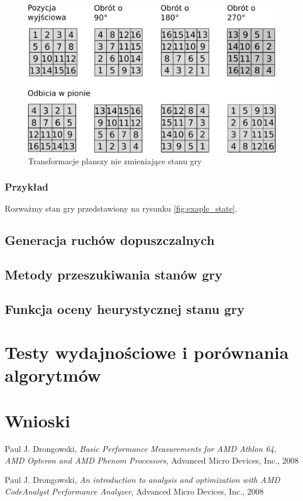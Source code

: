 \documentclass{scrartcl}
\begin{document}
\begin{figure}
  \centering
  \includegraphics[width=\textwidth]{data/field_order2.pdf}
  \caption{Transformacje planszy nie zmieniające stanu gry}
  \label{fig:field_order2}
\end{figure}


\subsubsection{Przykład}

Rozważmy stan gry przedstawiony na rysunku \ref{fig:exaple_state}.



\subsection{Generacja ruchów dopuszczalnych}

\subsection{Metody przeszukiwania stanów gry}

\subsection{Funkcja oceny heurystycznej stanu gry}

\section{Testy wydajnościowe i porównania algorytmów}

\section{Wnioski}

\begin{thebibliography}{9}

 Paul J. Drongowski,
  \emph{Basic Performance Measurements for AMD Athlon 64, 
AMD Opteron and AMD Phenom Processors}, Advanced Micro Devices, Inc.,
  2008

 Paul J. Drongowski,
  \emph{An introduction to analysis and optimization 
with AMD CodeAnalyst Performance Analyzer}, Advanced Micro Devices, Inc.,
  2008

\end{thebibliography}
\end{document}
